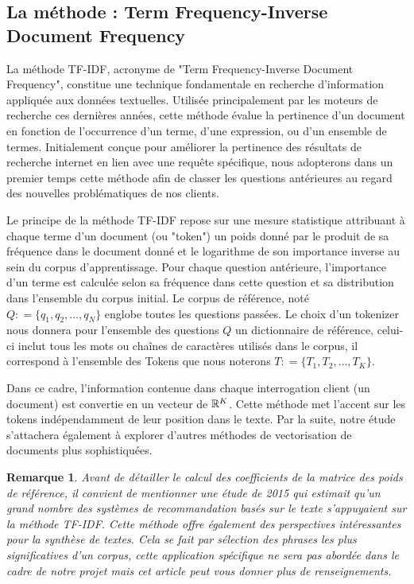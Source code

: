 \documentclass[12pt]{article}
\newtheorem{rmq}{Remarque}
\theoremstyle{definition}
\begin{document}
	\subsection{La méthode : Term Frequency-Inverse Document Frequency}
	
	La méthode TF-IDF, acronyme de "Term Frequency-Inverse Document Frequency", constitue une technique fondamentale en recherche d'information appliquée aux données textuelles. Utilisée principalement par les moteurs de recherche ces dernières années, cette méthode évalue la pertinence d'un document en fonction de l'occurrence d'un terme, d'une expression, ou d'un ensemble de termes. Initialement conçue pour améliorer la pertinence des résultats de recherche internet en lien avec une requête spécifique, nous adopterons dans un premier temps cette méthode afin de classer les questions antérieures au regard des nouvelles problématiques de nos clients.
	
	Le principe de la méthode TF-IDF repose sur une mesure statistique attribuant à chaque terme d'un document (ou "token") un poids donné par le produit de sa fréquence dans le document donné et le logarithme de son importance inverse au sein du corpus d'apprentissage. Pour chaque question antérieure, l'importance d'un terme est calculée selon sa fréquence dans cette question et sa distribution dans l'ensemble du corpus initial. Le corpus de référence, noté $Q : = \{q_1,q_2,\dots,q_N\}$ englobe toutes les questions passées. Le choix d'un tokenizer nous donnera pour l'ensemble des questions $Q$ un dictionnaire de référence, celui-ci inclut tous les mots ou chaînes de caractères utilisés dans le corpus, il correspond à l'ensemble des Tokens que nous noterons $T : = \{T_1,T_2,\dots,T_K\}$.
	
	Dans ce cadre, l'information contenue dans chaque interrogation client (un document) est convertie en un vecteur de $\mathbb{R}^K$. Cette méthode met l'accent sur les tokens indépendamment de leur position dans le texte. Par la suite, notre étude s'attachera également à explorer d'autres méthodes de vectorisation de documents plus sophistiquées.\\
	
	\begin{rmq}
		Avant de détailler le calcul des coefficients de la matrice des poids de référence, il convient de mentionner une étude de 2015 \cite{etude2015} qui estimait qu'un grand nombre des systèmes de recommandation basés sur le texte s'appuyaient sur la méthode TF-IDF. Cette méthode offre également des perspectives intéressantes pour la synthèse de textes. Cela se fait par sélection des phrases les plus significatives d'un corpus, cette application spécifique ne sera pas abordée dans le cadre de notre projet mais cet article \cite{TFIDFsumup} peut vous donner plus de renseignements.
	\end{rmq}
	
\end{document}

